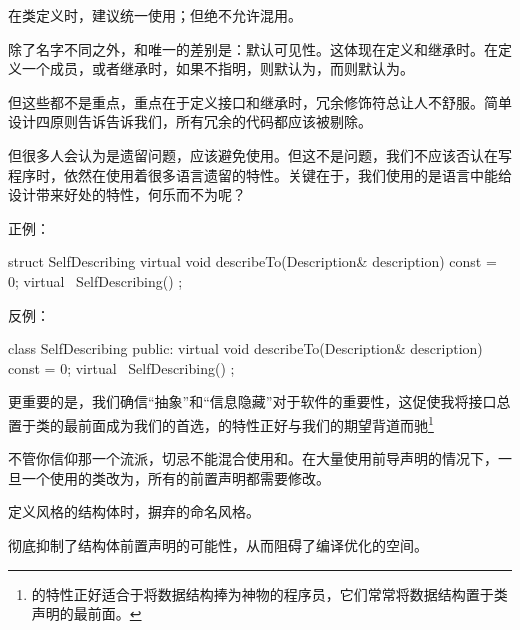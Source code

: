 \begin{content}

\begin{advise}
在类定义时，建议统一使用；但绝不允许混用。
\end{advise}

除了名字不同之外，和唯一的差别是：默认可见性。这体现在定义和继承时。在定义一个成员，或者继承时，如果不指明，则默认为，而则默认为。

但这些都不是重点，重点在于定义接口和继承时，冗余修饰符总让人不舒服。简单设计四原则告诉告诉我们，所有冗余的代码都应该被剔除。

但很多人会认为是\clang{}遗留问题，应该避免使用。但这不是问题，我们不应该否认在写\cpp{}程序时，依然在使用着很多\clang{}语言遗留的特性。关键在于，我们使用的是\clang{}语言中能给设计带来好处的特性，何乐而不为呢？

正例：
\begin{leftbar}
\begin{c++}
struct SelfDescribing
{
    virtual void describeTo(Description& description) const = 0;
    virtual ~SelfDescribing() {}
};
\end{c++}
\end{leftbar}

反例：
\begin{leftbar}
\begin{c++}
class SelfDescribing
{
public:
    virtual void describeTo(Description& description) const = 0;
    virtual ~SelfDescribing() {}
};
\end{c++}
\end{leftbar}

更重要的是，我们确信“抽象”和“信息隐藏”对于软件的重要性，这促使我将接口总置于类的最前面成为我们的首选，的特性正好与我们的期望背道而驰\footnote{的特性正好适合于将数据结构捧为神物的程序员，它们常常将数据结构置于类声明的最前面。}

不管你信仰那一个流派，切忌不能混合使用和。在大量使用前导声明的情况下，一旦一个使用的类改为，所有的前置声明都需要修改。

\begin{regulation}
定义\clang{}风格的结构体时，摒弃的命名风格。
\end{regulation}

彻底抑制了结构体前置声明的可能性，从而阻碍了编译优化的空间。


\end{content}
